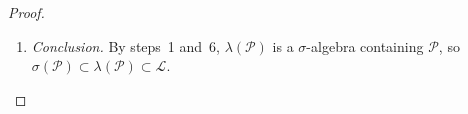 \begin{notechapter}
\begin{proof}
\begin{enumerate}[nosep]
\begin{itemize}[nosep]
                applied with $P$ as the frozen set, says that every
                member of $\lambda(\mathcal P)$ is a good partner of $P$;
                in particular $P\cap A\in\lambda(\mathcal P)$. Since
                $A\cap P = P\cap A$, this says that $P$ is a good partner
                of $A$. So $\mathcal G_A$ contains $\mathcal P$.
          \item \emph{Minimality again} (fourth square). $\mathcal G_A$
                is a $\lambda$-system by step~4 and contains
                $\mathcal P$; since $\lambda(\mathcal P)$ is the smallest
                such $\lambda$-system, $\lambda(\mathcal P)\subset
                \mathcal G_A$, and $\mathcal G_A\subset\lambda(\mathcal P)$
                by definition. So $\mathcal G_A = \lambda(\mathcal P)$:
                $A\cap B\in\lambda(\mathcal P)$ for every
                $B\in\lambda(\mathcal P)$.
        \end{itemize}
        Since $A$ was any member of $\lambda(\mathcal P)$,
        $\lambda(\mathcal P)$ is a $\pi$-system.
  \item \emph{Conclusion.} By steps~1 and~6, $\lambda(\mathcal P)$ is a
        $\sigma$-algebra containing $\mathcal P$, so
        $\sigma(\mathcal P)\subset\lambda(\mathcal P)\subset\mathcal L$.
\end{enumerate}
\end{proof}


\end{notechapter}
